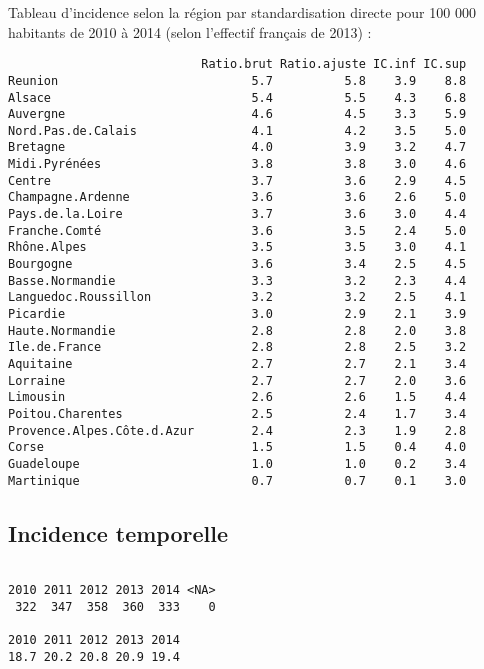 \documentclass[11pt,a4paper]{article}\usepackage[]{graphicx}\usepackage[]{color}
\makeatletter
\newenvironment{kframe}{%
 \def\at@end@of@kframe{}%
 \ifinner\ifhmode%
  \def\at@end@of@kframe{\end{minipage}}%
  \begin{minipage}{\columnwidth}%
 \fi\fi%
 \def\FrameCommand##1{\hskip\@totalleftmargin \hskip-\fboxsep
 \colorbox{shadecolor}{##1}\hskip-\fboxsep
     \hskip-\linewidth \hskip-\@totalleftmargin \hskip\columnwidth}%
 \MakeFramed {\advance\hsize-\width
   \@totalleftmargin\z@ \linewidth\hsize
   \@setminipage}}%
 {\par\unskip\endMakeFramed%
 \at@end@of@kframe}
\newenvironment{knitrout}{}{} %
\makeatother
\begin{document}
Tableau d'incidence selon la région par standardisation directe pour 100 000 habitants de 2010 à 2014 (selon l'effectif français de 2013) :
\begin{knitrout}
\color{fgcolor}\begin{kframe}
\begin{verbatim}
                           Ratio.brut Ratio.ajuste IC.inf IC.sup
Reunion                           5.7          5.8    3.9    8.8
Alsace                            5.4          5.5    4.3    6.8
Auvergne                          4.6          4.5    3.3    5.9
Nord.Pas.de.Calais                4.1          4.2    3.5    5.0
Bretagne                          4.0          3.9    3.2    4.7
Midi.Pyrénées                     3.8          3.8    3.0    4.6
Centre                            3.7          3.6    2.9    4.5
Champagne.Ardenne                 3.6          3.6    2.6    5.0
Pays.de.la.Loire                  3.7          3.6    3.0    4.4
Franche.Comté                     3.6          3.5    2.4    5.0
Rhône.Alpes                       3.5          3.5    3.0    4.1
Bourgogne                         3.6          3.4    2.5    4.5
Basse.Normandie                   3.3          3.2    2.3    4.4
Languedoc.Roussillon              3.2          3.2    2.5    4.1
Picardie                          3.0          2.9    2.1    3.9
Haute.Normandie                   2.8          2.8    2.0    3.8
Ile.de.France                     2.8          2.8    2.5    3.2
Aquitaine                         2.7          2.7    2.1    3.4
Lorraine                          2.7          2.7    2.0    3.6
Limousin                          2.6          2.6    1.5    4.4
Poitou.Charentes                  2.5          2.4    1.7    3.4
Provence.Alpes.Côte.d.Azur        2.4          2.3    1.9    2.8
Corse                             1.5          1.5    0.4    4.0
Guadeloupe                        1.0          1.0    0.2    3.4
Martinique                        0.7          0.7    0.1    3.0
\end{verbatim}
\end{kframe}
\end{knitrout}

  \subsection{Incidence temporelle}

\begin{knitrout}
\color{fgcolor}\begin{kframe}
\begin{verbatim}

2010 2011 2012 2013 2014 <NA> 
 322  347  358  360  333    0 

2010 2011 2012 2013 2014 
18.7 20.2 20.8 20.9 19.4 
\end{verbatim}
\end{kframe}
\end{knitrout}
\end{document}
